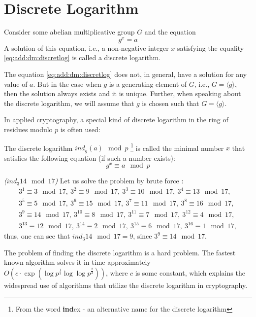 \section{Discrete Logarithm}
\label{AddDiscretLog}

\begin{definition}
Consider some abelian multiplicative group $G$ and the equation 
\begin{equation}
g^x = a
\label{eq:add:dm:discretlog}
\end{equation}
A solution of this equation, i.e., a non-negative integer $x$
satisfying the equality \eqref{eq:add:dm:discretlog} is called
a discrete logarithm.
\end{definition}

The equation \eqref{eq:add:dm:discretlog} does not, in general, have a solution
for any value of $a$. But in the case when $g$ is a generating
element of $G$, i.e., $G=\langle g\rangle$, then the solution always exists and it is
unique. Further, when speaking about the discrete logarithm, we will
assume that $g$ is chosen such that $G=\langle g\rangle$.

In applied cryptography, a special kind of
discrete logarithm in the ring of residues modulo $p$ is often used:
\begin{definition}
The discrete logarithm $ind_g\left(a\right) \mod{p}$
\footnote{From the word {\bf ind}ex - an alternative name for the discrete logarithm}
is called
the minimal number $x$ that satisfies the following equation
(if such a number exists): 
\begin{equation}
g^x \equiv a \mod{p}
\end{equation}
\end{definition}

\begin{example}
\emph{($ind_3{14} \mod{17}$)}
Let us solve the problem by brute force \cite{bWikiDiscretLog}:
\begin{eqnarray}
3^1 \equiv 3 \mod{17},\: 
3^2 \equiv 9 \mod{17},\: 
3^3 \equiv 10 \mod{17},\:
3^4 \equiv 13 \mod{17}, 
\nonumber \\
3^5 \equiv 5 \mod{17},\: 
3^6 \equiv 15 \mod{17},\: 
3^7 \equiv 11 \mod{17},\: 
3^8 \equiv 16 \mod{17}, 
\nonumber \\
3^9 \equiv 14 \mod{17},\: 
3^{10} \equiv 8 \mod{17},\: 
3^{11} \equiv 7 \mod{17},\: 
3^{12} \equiv 4 \mod{17}, 
\nonumber \\
3^{13} \equiv 12 \mod{17},\: 
3^{14} \equiv 2 \mod{17},\:
3^{15} \equiv 6 \mod{17},\: 
3^{16} \equiv 1 \mod{17},
\nonumber
\end{eqnarray}
thus, one can see that $ind_3{14} \mod{17} = 9$, 
since $3^9 \equiv 14 \mod{17}$. 
\label{ex:dm:discretlog}
\end{example}

The problem of finding the discrete logarithm is a hard
problem. The fastest known algorithm
\cite{bGordon93discretelogarithms} solves it in time approximately
\(
O\left(c \cdot
\exp\left(\log{p}^{\frac{1}{3}}\log{\log{p}}^{\frac{2}{3}}
\right)\right)
\), where $c$ is some constant,
which explains the widespread use of algorithms that utilize
the discrete logarithm in cryptography.
